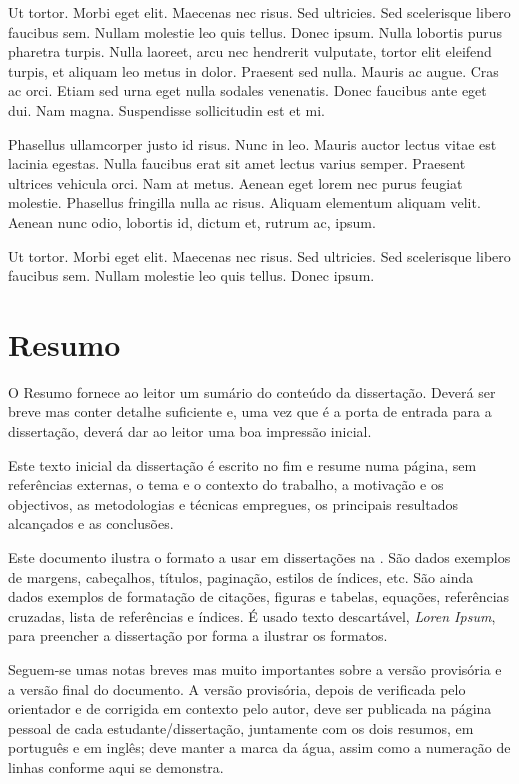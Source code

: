 Ut tortor. Morbi eget elit. Maecenas nec risus. Sed ultricies. Sed scelerisque
libero faucibus sem. Nullam molestie leo quis tellus. Donec ipsum. Nulla
lobortis purus pharetra turpis. Nulla laoreet, arcu nec hendrerit vulputate,
tortor elit eleifend turpis, et aliquam leo metus in dolor. Praesent sed nulla.
Mauris ac augue. Cras ac orci. Etiam sed urna eget nulla sodales venenatis.
Donec faucibus ante eget dui. Nam magna. Suspendisse sollicitudin est et mi. 

Phasellus ullamcorper justo id risus. Nunc in leo. Mauris auctor lectus vitae
est lacinia egestas. Nulla faucibus erat sit amet lectus varius semper.
Praesent ultrices vehicula orci. Nam at metus. Aenean eget lorem nec purus
feugiat molestie. Phasellus fringilla nulla ac risus. Aliquam elementum aliquam
velit. Aenean nunc odio, lobortis id, dictum et, rutrum ac, ipsum. 

Ut tortor. Morbi eget elit. Maecenas nec risus. Sed ultricies. Sed scelerisque
libero faucibus sem. Nullam molestie leo quis tellus. Donec ipsum. 

\chapter*{Resumo}

O Resumo fornece ao leitor um sumário do conteúdo da dissertação. Deverá ser
breve mas conter detalhe suficiente e, uma vez que é a porta de entrada para a
dissertação, deverá dar ao leitor uma boa impressão inicial.

Este texto inicial da dissertação é escrito no fim e resume numa página, sem
referências externas, o tema e o contexto do trabalho, a motivação e os
objectivos, as metodologias e técnicas empregues, os principais resultados
alcançados e as conclusões.

Este documento ilustra o formato a usar em dissertações na \Feup. São dados
exemplos de margens, cabeçalhos, títulos, paginação, estilos de índices, etc.
São ainda dados exemplos de formatação de citações, figuras e tabelas,
equações, referências cruzadas, lista de referências e índices.
É usado texto descartável, \emph{Loren Ipsum}, para preencher a dissertação por
forma a ilustrar os formatos.

Seguem-se umas notas breves mas muito importantes sobre a versão provisória e a
versão final do documento. A versão provisória, depois de verificada pelo
orientador e de corrigida em contexto pelo autor, deve ser publicada na página
pessoal de cada estudante/dissertação, juntamente com os dois resumos, em
português e em inglês; deve manter a marca da água, assim como a numeração de
linhas conforme aqui se demonstra.

